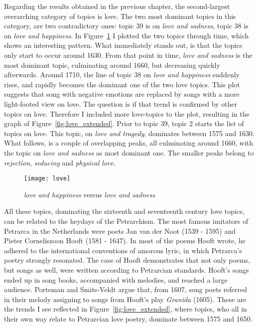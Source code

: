 Regarding the results obtained in the previous chapter, the second-largest overarching category of topics is love. The two most dominant topics in this category, are two contradictory ones: topic 39 is on \textit{love and sadness}, topic 38 is on \textit{love and happiness}. In Figure~\ref{fig:love} I plotted the two topics through time, which shows an interesting pattern. What immediately stands out, is that the topics only start to occur around 1630. From that point in time, \textit{love and sadness} is the most dominant topic, culminating around 1660, but decreasing quickly afterwards. Around 1710, the line of topic 38 on \textit{love and happiness} suddenly rises, and rapidly becomes the dominant one of the two love topics. This plot suggests that song with negative emotions are replaced by songs with a more light-footed view on love. The question is if that trend is confirmed by other topics on love. Therefore I included more love-topics to the plot, resulting in the graph of Figure~\ref{fig:love_extended}. Prior to topic 39, topic 2 starts the list of topics on love. This topic, on \textit{love and tragedy}, dominates between 1575 and 1630. What follows, is a couple of overlapping peaks, all culminating around 1660, with the topic on \textit{love and sadness} as most dominant one. The smaller peaks belong to \textit{rejection}, \textit{seducing} and \textit{physical love}.

\begin{figure}[hbt!]
	\centering
	\texttt{[image: love]}
	\caption{\textit{love and happiness} versus \textit{love and sadness}}
	\label{fig:love}
\end{figure}

All these topics, dominating the sixteenth and seventeenth century love topics, can be related to the heydays of the Petrarchism. The most famous imitators of Petrarca in the Netherlands were poets Jan van der Noot (1539 - 1595) and Pieter Corneliszoon Hooft (1581 - 1647).\autocite[46, 206]{porteman_een_2009} In most of the poems Hooft wrote, he adhered to the international conventions of amorous lyric, in which Petrarca's poetry strongly resonated. The case of Hooft demonstrates that not only poems, but songs as well, were written according to Petrarcian standards. Hooft's songs ended up in song books, accompanied with melodies, and reached a large audience.\autocite[46, 206]{porteman_een_2009} Porteman and Smits-Veldt argue that, from 1607, song poets referred in their melody assigning to songs from Hooft's play \textit{Granida} (1605).\autocite[206]{porteman_een_2009} These are the trends I see reflected in Figure~\ref{fig:love_extended}, where topics, who all in their own way relate to Petrarcian love poetry, dominate between 1575 and 1650.

